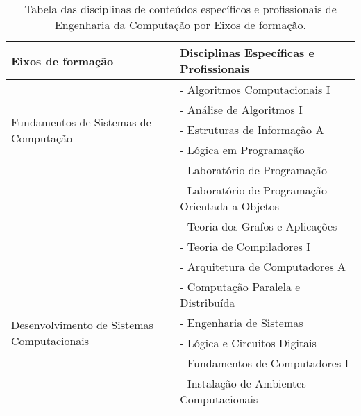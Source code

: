 \begin{table}[ht]

\centering

\caption{Tabela das disciplinas de conteúdos específicos e profissionais de Engenharia da Computação por Eixos de formação.}

\label{tab:areas}

\begin{tabularx}{\textwidth}{ p{4cm} p{8cm} }
    
    \hline
    
    {\bf Eixos de formação} & {\bf Disciplinas Específicas e Profissionais} \\
    
    \hline
    
    \multirow{5}{=}{Fundamentos de Sistemas de Computação} 
    & - Algoritmos Computacionais I \\ 
    
    & - Análise de Algoritmos I \\ 
    
    & - Estruturas de Informação A \\ 
    
    & - Lógica em Programação \\ 
    
    & - Laboratório de Programação \\ 
    
    & - Laboratório de Programação Orientada a Objetos \\ 
    
    & - Teoria dos Grafos e Aplicações \\
    
    & - Teoria de Compiladores I \\ \hline
    
    \multirow{8}{=}{Desenvolvimento de Sistemas Computacionais} 
    & - Arquitetura de Computadores A \\ 
    
    & - Computação Paralela e Distribuída \\ 
    
    & - Engenharia de Sistemas \\ 
    
    & - Lógica e Circuitos Digitais \\ 
    
    & - Fundamentos de Computadores I \\ 
    
    & - Instalação de Ambientes Computacionais \\ 
    

\end{tabularx}
\end{table}

